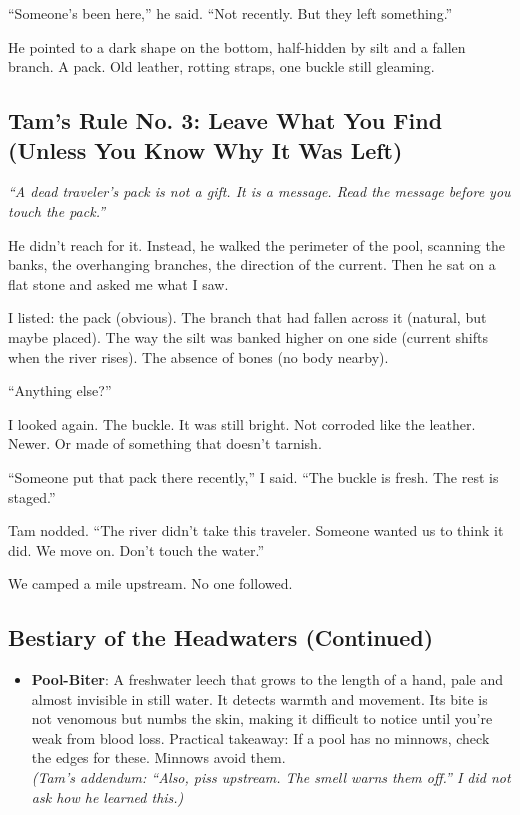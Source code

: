 \documentclass[11pt]{article}
\begin{document}
``Someone's been here,'' he said. ``Not recently. But they left something.''

He pointed to a dark shape on the bottom, half-hidden by silt and a fallen branch. A pack. Old leather, rotting straps, one buckle still gleaming.

\subsection*{Tam's Rule No. 3: Leave What You Find (Unless You Know Why It Was Left)}
\textit{``A dead traveler's pack is not a gift. It is a message. Read the message before you touch the pack.''}

He didn't reach for it. Instead, he walked the perimeter of the pool, scanning the banks, the overhanging branches, the direction of the current. Then he sat on a flat stone and asked me what I saw.

I listed: the pack (obvious). The branch that had fallen across it (natural, but maybe placed). The way the silt was banked higher on one side (current shifts when the river rises). The absence of bones (no body nearby).

``Anything else?''

I looked again. The buckle. It was still bright. Not corroded like the leather. Newer. Or made of something that doesn't tarnish.

``Someone put that pack there recently,'' I said. ``The buckle is fresh. The rest is staged.''

Tam nodded. ``The river didn't take this traveler. Someone wanted us to think it did. We move on. Don't touch the water.''

We camped a mile upstream. No one followed.

\subsection*{Bestiary of the Headwaters (Continued)}
\begin{itemize}
    \item \textbf{Pool-Biter}: A freshwater leech that grows to the length of a hand, pale and almost invisible in still water. It detects warmth and movement. Its bite is not venomous but numbs the skin, making it difficult to notice until you're weak from blood loss. Practical takeaway: If a pool has no minnows, check the edges for these. Minnows avoid them.\\
    \textit{(Tam's addendum: ``Also, piss upstream. The smell warns them off.'' I did not ask how he learned this.)}
\end{itemize}
\end{document}

